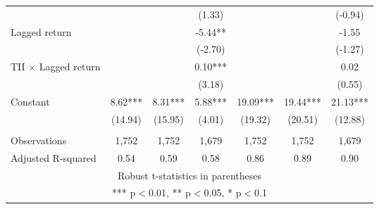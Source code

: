 \documentclass[]{article}
\begin{document}
\begin{tabular}{lcccccc}
 &  &  & (1.33) &  &  & (-0.94) \\
Lagged return &  &  & -5.44** &  &  & -1.55 \\
 &  &  & (-2.70) &  &  & (-1.27) \\
TII $\times$ Lagged return &  &  & 0.10*** &  &  & 0.02 \\
 &  &  & (3.18) &  &  & (0.55) \\
Constant & 8.62*** & 8.31*** & 5.88*** & 19.09*** & 19.44*** & 21.13*** \\
 & (14.94) & (15.95) & (4.01) & (19.32) & (20.51) & (12.88) \\
 &  &  &  &  &  &  \\
Observations & 1,752 & 1,752 & 1,679 & 1,752 & 1,752 & 1,679 \\
 Adjusted R-squared & 0.54 & 0.59 & 0.58 & 0.86 & 0.89 & 0.90 \\ \hline
\multicolumn{7}{c}{ Robust t-statistics in parentheses} \\
\multicolumn{7}{c}{ *** p$<$0.01, ** p$<$0.05, * p$<$0.1} \\
\end{tabular}
\end{document}
